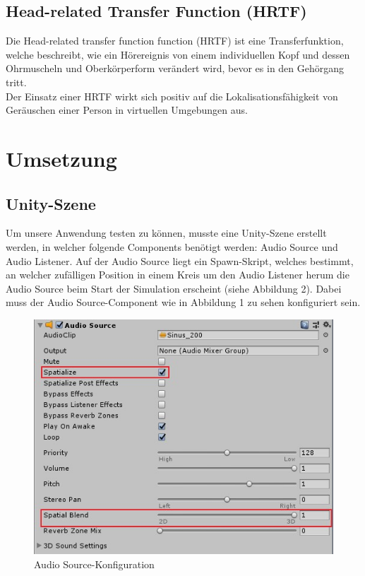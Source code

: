 \documentclass[12pt,a4paper]{article}
\begin{document}
\subsection{Head-related Transfer Function (HRTF)}
Die Head-related transfer function function (HRTF) ist eine Transferfunktion, welche beschreibt, wie ein Hörereignis von einem individuellen Kopf und dessen Ohrmuscheln und Oberkörperform verändert wird, bevor es in den Gehörgang tritt.\\
Der Einsatz einer HRTF wirkt sich positiv auf die Lokalisationsfähigkeit von Geräuschen einer Person in virtuellen Umgebungen aus.

\section{Umsetzung}
\subsection{Unity-Szene}
Um unsere Anwendung testen zu können, musste eine Unity-Szene erstellt werden, in welcher folgende Components benötigt werden: Audio Source und Audio Listener. Auf der Audio Source liegt ein Spawn-Skript, welches bestimmt, an welcher zufälligen Position in einem Kreis um den Audio Listener herum die Audio Source beim Start der Simulation erscheint (siehe Abbildung 2). Dabei muss der Audio Source-Component wie in Abbildung 1 zu sehen konfiguriert sein.\\

\begin{figure}[h!]
\centering
\includegraphics[scale=0.6]{setup2}
\caption{Audio Source-Konfiguration}
\end{figure}
\end{document}
